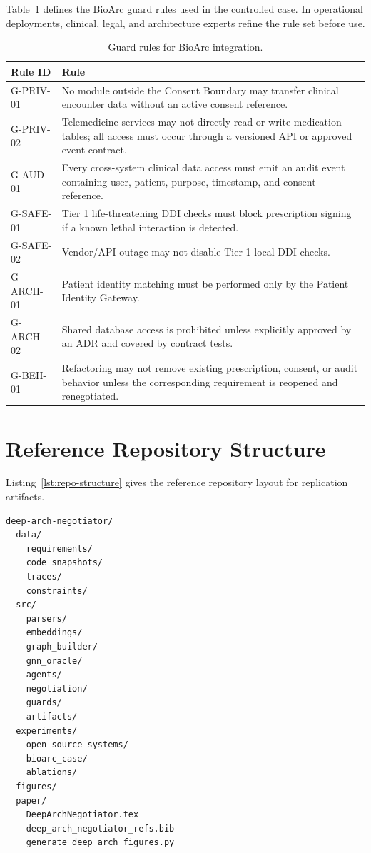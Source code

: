 \documentclass[english,preprint,nonatbib]{elsarticle}
\begin{document}
Table~\ref{tab:guard-rules} defines the BioArc guard rules used in the controlled case. In operational deployments, clinical, legal, and architecture experts refine the rule set before use.

\begin{longtable}{p{2.2cm}p{10.8cm}}
\caption{Guard rules for BioArc integration.}\label{tab:guard-rules}\\
\toprule
Rule ID & Rule \\
\midrule
G-PRIV-01 & No module outside the Consent Boundary may transfer clinical encounter data without an active consent reference.
\\
G-PRIV-02 & Telemedicine services may not directly read or write medication tables;
all access must occur through a versioned API or approved event contract.
\\
G-AUD-01 & Every cross-system clinical data access must emit an audit event containing user, patient, purpose, timestamp, and consent reference.
\\
G-SAFE-01 & Tier 1 life-threatening DDI checks must block prescription signing if a known lethal interaction is detected.
\\
G-SAFE-02 & Vendor/API outage may not disable Tier 1 local DDI checks.
\\
G-ARCH-01 & Patient identity matching must be performed only by the Patient Identity Gateway.
\\
G-ARCH-02 & Shared database access is prohibited unless explicitly approved by an ADR and covered by contract tests.
\\
G-BEH-01 & Refactoring may not remove existing prescription, consent, or audit behavior unless the corresponding requirement is reopened and renegotiated.
\\
\bottomrule
\end{longtable}

\section{Reference Repository Structure}
\label{app:repo}

Listing~\ref{lst:repo-structure} gives the reference repository layout for replication artifacts.

\begin{lstlisting}[caption={Reference repository structure.},label={lst:repo-structure}]
deep-arch-negotiator/
  data/
    requirements/
    code_snapshots/
    traces/
    constraints/
  src/
    parsers/
    embeddings/
    graph_builder/
    gnn_oracle/
    agents/
    negotiation/
    guards/
    artifacts/
  experiments/
    open_source_systems/
    bioarc_case/
    ablations/
  figures/
  paper/
    DeepArchNegotiator.tex
    deep_arch_negotiator_refs.bib
    generate_deep_arch_figures.py
\end{lstlisting}
\end{document}
